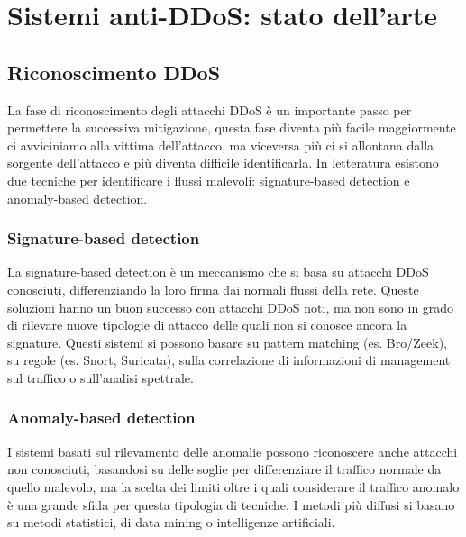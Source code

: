 
\chapter{Sistemi anti-DDoS: stato dell'arte}


\section{Riconoscimento DDoS}

La fase di riconoscimento degli attacchi DDoS è un importante passo per permettere la successiva mitigazione, questa fase diventa più facile maggiormente ci avviciniamo alla vittima dell'attacco, ma viceversa più ci si allontana dalla sorgente dell'attacco e più diventa difficile identificarla. In letteratura esistono due tecniche per identificare i flussi malevoli: signature-based detection e anomaly-based detection.

\subsection{Signature-based detection}

La signature-based detection è un meccanismo che si basa su attacchi DDoS conosciuti, differenziando la loro firma dai normali flussi della rete. Queste soluzioni hanno un buon successo con attacchi DDoS noti, ma non sono in grado di rilevare nuove tipologie di attacco delle quali non si conosce ancora la signature. Questi sistemi si possono basare su pattern matching (es. Bro/Zeek), su regole (es. Snort, Suricata), sulla correlazione di informazioni di management sul traffico o sull'analisi spettrale.

\subsection{Anomaly-based detection}

I sistemi basati sul rilevamento delle anomalie possono riconoscere anche attacchi non conosciuti, basandosi su delle soglie per differenziare il traffico normale da quello malevolo, ma la scelta dei limiti oltre i quali considerare il traffico anomalo è una grande sfida per questa tipologia di tecniche.
I metodi più diffusi si basano su metodi statistici, di data mining o intelligenze artificiali.


